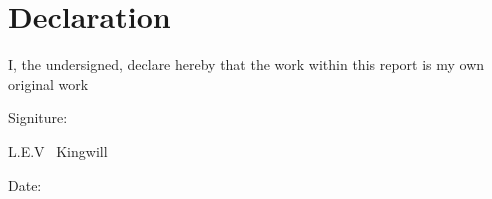 \chapter{Declaration}

I, the undersigned, declare hereby that the work within this report 
is my own original work\par
\vspace{3cm}

\noindent%
\parbox{.5\textwidth}{%
	Signiture:\quad\dotfill\par
	\hfill L.E.V \ Kingwill\hspace{1.2cm}\null}


\vspace{1.5cm}
\noindent%
\parbox{.5\textwidth}{%
	Date:\quad\dotfill\par}
